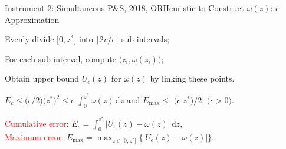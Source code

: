 \documentclass[14pt]{beamer}
\begin{document}
\begin{frame}{Instrument 2: Simultaneous P\&S, {\footnotesize 2018, OR}}{Heuristic to Construct $\omega(z)$: $\epsilon$-Approximation}
\small
\begin{description}
\justifying
	\item[Step 1.] Evenly divide $\big[0,z^*\big]$ into $\lceil 2v/\epsilon\rceil$ sub-intervals;
	\item[Step 2.] For each sub-interval, compute $\big(z_i,\omega(z_i)\big)$;
	\item[Step 3.] Obtain upper bound $U_{\epsilon}(z)$ for $\omega(z)$ by linking these points.
\end{description}
\vspace{-1mm}
\begin{theorem}\label{thm:epsilonapproximation}
\justifying
\rm
\small
$E_c \leq \big(\epsilon/2\big) \big(z^* \big)^2 \leq \epsilon$ {$\int_0^{z^*}\omega(z) \,\mathrm{d}z$} and $E_{\max}\leq$ {$\big($}$\epsilon$ {$z^*\big)/2$}, $\big(\epsilon>0\big)$.
\end{theorem}
\vspace{4mm}
\textcolor{red}{Cumulative error}: $E_c = \int_0^{z^*} \big| U_{\epsilon}(z)-\omega(z) \big| \,\mathrm{d} z$,\\
\textcolor{red}{Maximum error}: $E_{\max}=\max_{z\in \big[0,z^*\big]}\big\{|U_{\epsilon}(z)-\omega(z)|\big\}$.
\end{frame}
\end{document}
